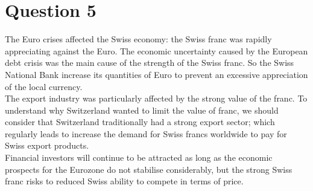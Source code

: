 \documentclass[
	12pt, %
]{fphw}
\begin{document}
\section*{Question 5}
The Euro crises affected the Swiss economy: the Swiss franc was rapidly appreciating against the Euro. The economic uncertainty caused by the European debt crisis was the main cause of the strength of the Swiss franc. So the Swiss National Bank increase its quantities of Euro to prevent an excessive appreciation of the local currency. \\
The export industry was particularly affected by the strong value of the franc. To understand why Switzerland wanted to limit the value of franc, we should consider that Switzerland traditionally had a strong export sector; which regularly leads to increase the demand for Swiss francs worldwide to pay for Swiss export products. \\
Financial investors will continue to be attracted as long as the economic prospects for the Eurozone do not stabilise considerably, but the strong Swiss franc risks to reduced Swiss ability to compete in terms of price.
\end{document}
